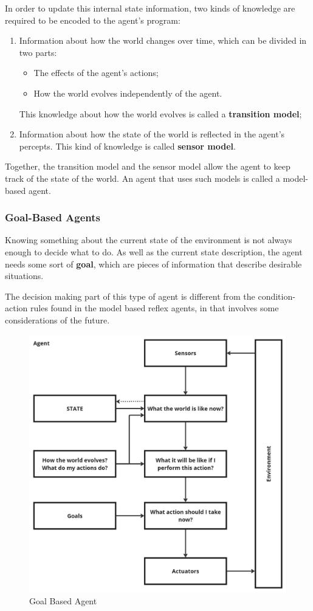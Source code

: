 \documentclass{article}
\begin{document}
In order to update this internal state information, two kinds of knowledge are required to be encoded to the agent's program:

\begin{enumerate}
    \item Information about how the world changes over time, which can be divided in two parts:
    \begin{itemize}
        \item The effects of the agent's actions;
        \item How the world evolves independently of the agent.
    \end{itemize}
    This knowledge about how the world evolves is called a \textbf{transition model};
    \item Information about how the state of the world is reflected in the agent's percepts. This kind of knowledge is called \textbf{sensor model}.
\end{enumerate}

Together, the transition model and the sensor model allow the agent to keep track of the state of the world. An agent that uses such models is called a model-based agent.

\subsubsection{Goal-Based Agents}
Knowing something about the current state of the environment is not always enough to decide what to do. As well as the current state description, the agent needs some sort of \textbf{goal}, which are pieces of information that describe desirable situations.

The decision making part of this type of agent is different from the condition-action rules found in the model based reflex agents, in that involves some considerations of the future.

\begin{figure}[h]
    \centering
    \includegraphics[width=0.75\linewidth]{images/Goal Based Agent.jpg}
    \caption{Goal Based Agent}
    \label{fig:goal_based_agent}
\end{figure}
\end{document}
